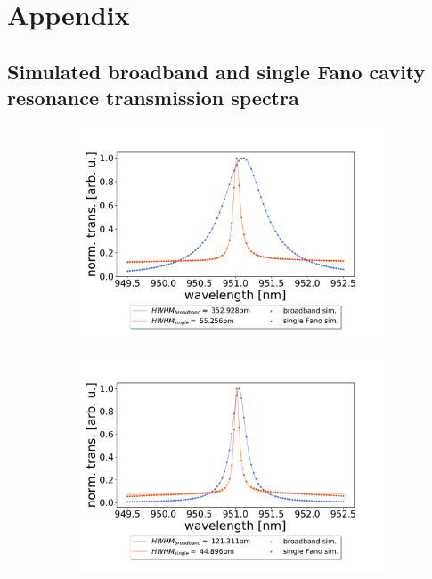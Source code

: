 \section{Appendix}

\subsection{Simulated broadband and single Fano cavity resonance transmission spectra}

\begin{figure}[h!]
    \centering
    \begin{subfigure}[b]{0.49\textwidth}
        \includegraphics[width=\textwidth]{figures/sim_single_vs_broadband_10um.pdf}
        \caption{}
        \label{fig:single_vs_broadband_simulation_10um}
    \end{subfigure}
    \begin{subfigure}[b]{0.49\textwidth}
        \includegraphics[width=\textwidth]{figures/sim_single_vs_broadband_30um.pdf}
        \caption{}
        \label{fig:single_vs_broadband_simulation_30um}
    \end{subfigure}
\end{figure}

